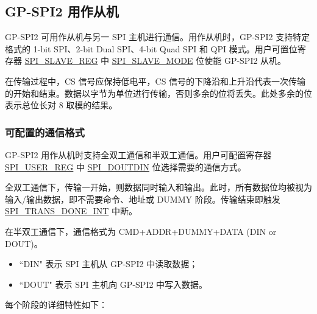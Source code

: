 \documentclass[main\_\_CN.tex]{subfiles}
\begin{document}
\subsection{GP-SPI2 用作从机}\label{sec:gp-spi2-slave-mode}

GP-SPI2 可用作从机与另一 SPI 主机进行通信。用作从机时，GP-SPI2 支持特定格式的 1-bit SPI、2-bit Dual SPI、4-bit Quad SPI 和 QPI 模式。用户可置位寄存器 \hyperref[regdesc:SPISLAVEREG]{SPI\_SLAVE\_REG} 中 \hyperref[fielddesc:SPISLAVEMODE]{SPI\_SLAVE\_MODE} 位使能 GP-SPI2 从机。 

在传输过程中，CS 信号应保持低电平，CS 信号的下降沿和上升沿代表一次传输的开始和结束。数据以字节为单位进行传输，否则多余的位将丢失。此处多余的位表示总位长对 8 取模的结果。

\subsubsection{可配置的通信格式}\label{slave communication format}

GP-SPI2 用作从机时支持全双工通信和半双工通信。用户可配置寄存器 \hyperref[regdesc:SPIUSERREG]{SPI\_USER\_REG} 中 \hyperref[fielddesc:SPIDOUTDIN]{SPI\_DOUTDIN} 位选择需要的通信方式。

全双工通信下，传输一开始，则数据同时输入和输出。此时，所有数据位均被视为输入/输出数据，即不需要命令、地址或 DUMMY 阶段。传输结束即触发 \hyperref[int:SPITRANSDONEINT]{SPI\_TRANS\_DONE\_INT} 中断。  

在半双工通信下，通信格式为 CMD+ADDR+DUMMY+DATA (DIN or DOUT)。
\begin{itemize}
    \item ``DIN" 表示 SPI 主机从 GP-SPI2 中读取数据；
    \item ``DOUT" 表示 SPI 主机向 GP-SPI2 中写入数据。
\end{itemize}

每个阶段的详细特性如下：
\end{document}
